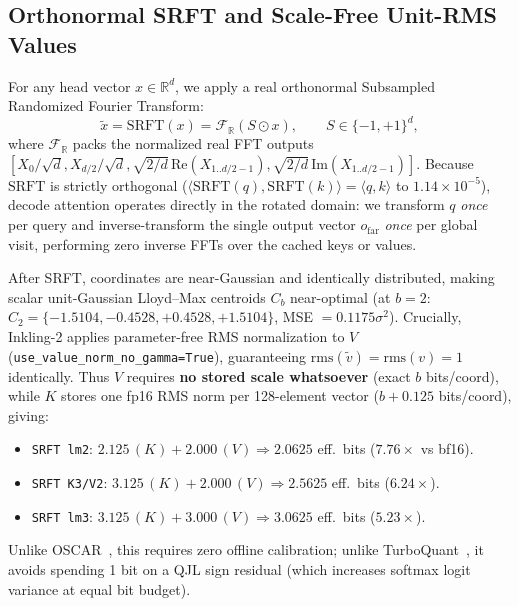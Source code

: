 \documentclass[conference]{IEEEtran}
\begin{document}
\subsection{Orthonormal SRFT and Scale-Free Unit-RMS Values}
For any head vector $x \in \mathbb{R}^d$, we apply a real orthonormal Subsampled Randomized Fourier Transform:
\begin{equation}
    \tilde{x} = \mathrm{SRFT}(x) = \mathcal{F}_{\mathbb{R}}(S \odot x), \qquad S \in \{-1, +1\}^d,
\end{equation}
where $\mathcal{F}_{\mathbb{R}}$ packs the normalized real FFT outputs $[X_0/\sqrt{d}, X_{d/2}/\sqrt{d}, \sqrt{2/d}\,\mathrm{Re}(X_{1..d/2-1}), \sqrt{2/d}\,\mathrm{Im}(X_{1..d/2-1})]$. Because $\mathrm{SRFT}$ is strictly orthogonal ($\langle \mathrm{SRFT}(q), \mathrm{SRFT}(k)\rangle = \langle q, k\rangle$ to $1.14\times 10^{-5}$), decode attention operates directly in the rotated domain: we transform $q$ \emph{once} per query and inverse-transform the single output vector $o_{\mathrm{far}}$ \emph{once} per global visit, performing zero inverse FFTs over the cached keys or values.

After SRFT, coordinates are near-Gaussian and identically distributed, making scalar unit-Gaussian Lloyd--Max centroids $C_b$ near-optimal (at $b=2$: $C_2 = \{-1.5104, -0.4528, +0.4528, +1.5104\}$, MSE $= 0.1175\sigma^2$). Crucially, Inkling-2 applies parameter-free RMS normalization to $V$ (\texttt{use\_value\_norm\_no\_gamma=True}), guaranteeing $\mathrm{rms}(\tilde{v}) = \mathrm{rms}(v) = 1$ identically. Thus $V$ requires \textbf{no stored scale whatsoever} (exact $b$ bits/coord), while $K$ stores one fp16 RMS norm per 128-element vector ($b + 0.125$ bits/coord), giving:
\begin{itemize}
    \item \texttt{SRFT lm2}: $2.125\,(K) + 2.000\,(V) \Rightarrow \mathbf{2.0625}$ eff.\ bits ($7.76\times$ vs bf16).
    \item \texttt{SRFT K3/V2}: $3.125\,(K) + 2.000\,(V) \Rightarrow \mathbf{2.5625}$ eff.\ bits ($6.24\times$).
    \item \texttt{SRFT lm3}: $3.125\,(K) + 3.000\,(V) \Rightarrow \mathbf{3.0625}$ eff.\ bits ($5.23\times$).
\end{itemize}
Unlike OSCAR~\cite{zhou2026oscar}, this requires zero offline calibration; unlike TurboQuant~\cite{zandieh2026turboquant}, it avoids spending 1 bit on a QJL sign residual (which increases softmax logit variance at equal bit budget).
\end{document}
